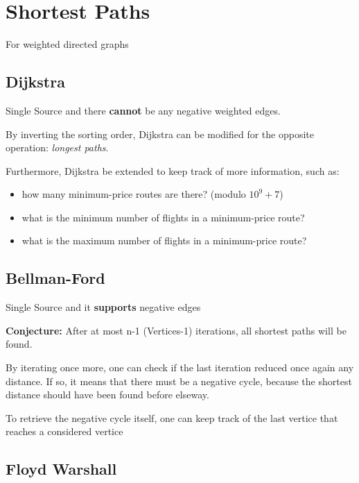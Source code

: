 \section{Shortest Paths}

	For weighted directed graphs

	\subsection{Dijkstra}

		Single Source and there \textbf{cannot} be any negative weighted edges. 


		By inverting the sorting order, Dijkstra can be modified for the opposite operation: \textit{longest paths}.

		Furthermore, Dijkstra be extended to keep track of more information, such as:

		\begin{itemize}
			\item how many minimum-price routes are there? (modulo $10^9+7$)
			\item what is the minimum number of flights in a minimum-price route?
			\item what is the maximum number of flights in a minimum-price route?
		\end{itemize}


	\subsection{Bellman-Ford}

		Single Source and it \textbf{supports} negative edges

		\textbf{Conjecture:} After at most n-1 (Vertices-1) iterations, all shortest paths will be found.
		

		By iterating once more, one can check if the last iteration reduced once again any distance. If so, it means that
		there must be a negative cycle, because the shortest distance should have been found before elseway.
		
		To retrieve the negative cycle itself, one can keep track of the last vertice that reaches a considered vertice

	
	\subsection{Floyd Warshall}


